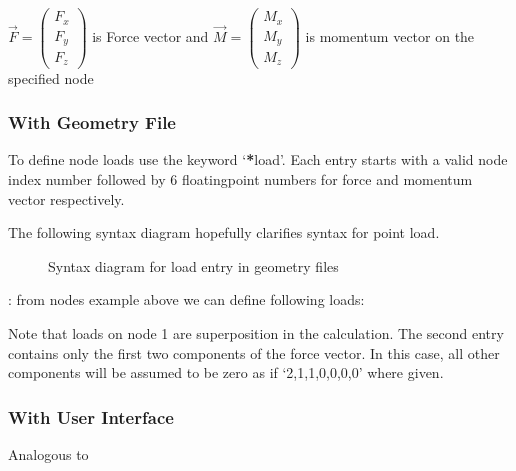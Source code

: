 \documentclass[letterpaper,10pt,english]{sphinxmanual}
\begin{document}
\(\vec{F}= \left( \begin{array}{c} F_x \\ F_y \\ F_z \end{array}\right)\) is Force vector
and
\(\vec{M}= \left( \begin{array}{c} M_x \\ M_y \\ M_z \end{array}\right)\) is momentum vector on the specified node


\subsubsection{With Geometry File}
\label{\detokenize{making_a_model:id11}}
To define node loads use the keyword ‘{\color{red}\bfseries{}*}load’. Each entry starts with a valid node index number followed by 6
floating\sphinxhyphen{}point numbers for force and momentum vector respectively.

The following syntax diagram hopefully clarifies syntax for point load.

\begin{figure}[htbp]
\centering
\capstart

\noindent{}
\caption{Syntax diagram for load entry in geometry files}\label{\detokenize{making_a_model:id25}}\end{figure}

:
from nodes example above we can define following loads:

\begin{sphinxVerbatim}[commandchars=\\\{\}]
 
 
\end{sphinxVerbatim}

Note that loads on node 1 are superposition in the calculation.
The second entry contains only the first two components of the force vector.
In this case, all other components will be assumed to be zero as if ‘2,1,1,0,0,0,0’ where given.


\subsubsection{With User Interface}
\label{\detokenize{making_a_model:id14}}
Analogous to {\hyperref[\detokenize{making_a_model:nodes-input}]{}}
\end{document}

